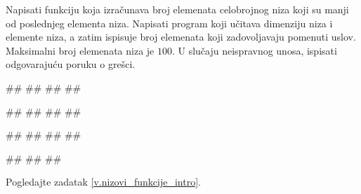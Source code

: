 \ifresenja
\begin{Answer}[ref=v.nizovi_funkcije_intro]
\end{Answer}
\fi


\begin{Exercise}[label=p.broj_manjih_od_poslednjeg] 
 Napisati funkciju koja izračunava broj elemenata celobrojnog niza koji su
 manji od poslednjeg elementa niza. 
 Napisati program koji učitava dimenziju niza i elemente niza, a zatim ispisuje broj
 elemenata koji zadovoljavaju pomenuti uslov.
 Maksimalni broj elemenata niza je $100$.
 U slučaju neispravnog unosa, ispisati odgovarajuću poruku o grešci. 

\begin{miditest}
\begin{upotreba}{1}
#\naslovInt#
##
##
##
\end{upotreba}
\end{miditest}
\begin{miditest}
\begin{upotreba}{2}
#\naslovInt#
##
##
##
\end{upotreba}
\end{miditest}

\begin{miditest}
\begin{upotreba}{3}
#\naslovInt#
##
##
##
\end{upotreba}
\end{miditest}
\begin{miditest}
\begin{upotreba}{4}
#\naslovInt#
##
##
\end{upotreba}
\end{miditest}

\end{Exercise}

\ifresenja
\begin{Answer}[ref=p.broj_manjih_od_poslednjeg]
Pogledajte zadatak \ref{v.nizovi_funkcije_intro}.
\end{Answer}
\fi


